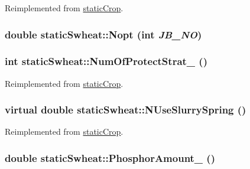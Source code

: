 Reimplemented from \hyperlink{classstatic_crop_a32b69ed138beaed150efa74d18e82d8e}{staticCrop}.\hypertarget{classstatic_swheat_a0fac837efbb053d9de826e9709d0279f}{
\subsubsection[{Nopt}]{\setlength{\rightskip}{0pt plus 5cm}double staticSwheat::Nopt (int {\em JB\_\-NO})}}
\label{classstatic_swheat_a0fac837efbb053d9de826e9709d0279f}
\hypertarget{classstatic_swheat_ad30778a7f2840d0a3dde131d745c4cdd}{
\subsubsection[{NumOfProtectStrat\_\-}]{\setlength{\rightskip}{0pt plus 5cm}int staticSwheat::NumOfProtectStrat\_\- ()}}
\label{classstatic_swheat_ad30778a7f2840d0a3dde131d745c4cdd}


Reimplemented from \hyperlink{classstatic_crop_a4d3d767f569f48eb68ffa76822302467}{staticCrop}.\hypertarget{classstatic_swheat_a78a69c67a091608009a1024631d814d6}{
\subsubsection[{NUseSlurrySpring}]{\setlength{\rightskip}{0pt plus 5cm}virtual double staticSwheat::NUseSlurrySpring ()}}
\label{classstatic_swheat_a78a69c67a091608009a1024631d814d6}


Reimplemented from \hyperlink{classstatic_crop_ae7d21ab4afc8d8355d231566e8d87b1b}{staticCrop}.\hypertarget{classstatic_swheat_a310150b4bfa8f472085d7ff8397291c2}{
\subsubsection[{PhosphorAmount\_\-}]{\setlength{\rightskip}{0pt plus 5cm}double staticSwheat::PhosphorAmount\_\- ()}}
\label{classstatic_swheat_a310150b4bfa8f472085d7ff8397291c2}


